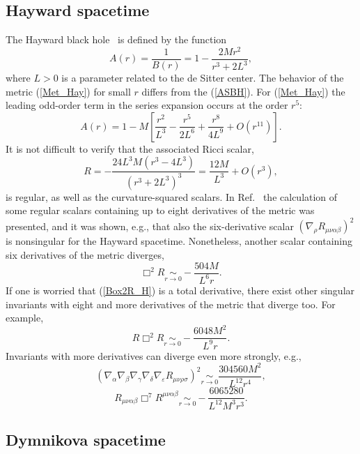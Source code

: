 \documentclass[aps,prd,a4paper,twocolumn,showpacs,showkeys,preprintnumbers,amsmath,amssymb,nofootinbib,usenames,dvipsnames]{revtex4-2}
\newcommand{\be}{\begin{eqnarray}}
\def\beq{\begin{equation}}
\def\eeq{\end{equation}}
\newcommand{\n}[1]{\label{#1}}
\def\al{\alpha}
\def\be{\beta}
\def\ga{\gamma}
\def\de{\delta}
\def\rh{\rho}
\def\si{\sigma}
\def\na{\nabla}
\begin{document}

\subsection{Hayward spacetime}

The Hayward black hole~\cite{Hayward} is defined by the function
%
\beq \label{Met_Hay}
A(r) = \frac{1}{B(r)} = 1 - \frac{ 2  M  r^2}{r^3 + 2L^3},
\eeq
where $L>0$ is a parameter related to the de Sitter center. The behavior of the metric (\ref{Met_Hay}) for small $r$ differs from the (\ref{ASBH}). For (\ref{Met_Hay}) the leading odd-order term in the series expansion occurs at the order $r^5$:
%
\beq \label{SeriesH}
A(r) =  1 -  M \left[ \frac{r^2}{L^3} - \frac{r^5}{2L^6} + \frac{r^8}{4L^9} + O(r^{11}) \right].
\eeq
%
It is not difficult to verify that the associated Ricci scalar,
%
\beq \label{R-Hay}
R = - \frac{24 L^3  M(r^3 - 4 L^3 )}{(r^3 + 2L^3)^3}  = \frac{12 M}{L^3} + O(r^3),
\eeq
is regular, as well as the curvature-squared scalars. In Ref.~\cite{Borissova:2020knn} the calculation of some regular scalars containing up to eight derivatives of the metric was presented, and it was shown, {e.g.}, that also the six-derivative scalar $(\na_\rh R_{\mu\nu\al\be})^2$
is nonsingular for the Hayward spacetime.
%
Nonetheless, another scalar containing six derivatives of the metric diverges,
%
\beq \label{Box2R_H}
\Box^2 R \underset{r \to 0}{\sim} - \frac{504  M}{L^6 r} .
\eeq 
%
If one is worried that (\ref{Box2R_H}) is a total derivative, there exist other singular invariants with eight and more derivatives of the metric that diverge too. For example, 
%
\beq \label{RBox2R_H}
R \Box^2 R \underset{r \to 0}{\sim} - \frac{6048  M^2}{L^9 r} .
\eeq
%
Invariants with more derivatives can diverge even more strongly, {e.g.},
%
\beq
\left( \na_\al\na_\be\na_\ga\na_\de\na_\varepsilon R_{\mu\nu\rh\si} \right) ^2 \underset{r \to 0}{\sim}  \frac{304560 M^2}{L^{12} r^4}  ,
\eeq
%
\beq
\n{box7}
R_{\mu\nu\al\be} \Box^7 R^{\mu\nu\al\be}  \underset{r \to 0}{\sim} -\frac{6065280}{L^{12} M^3 r^3}.
\eeq



\subsection{Dymnikova spacetime}
\end{document}
